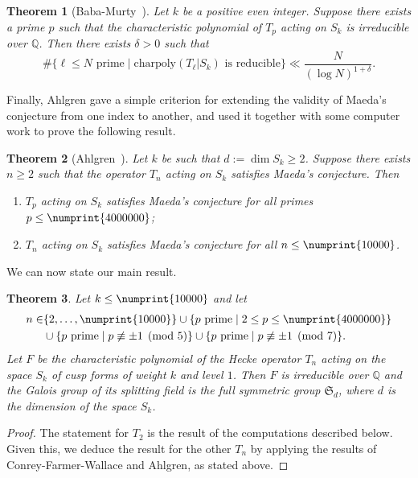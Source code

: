 \documentclass[11pt]{article}
\theoremstyle{plain}
\newtheorem{theorem}{Theorem}[section]
\theoremstyle{definition}
\theoremstyle{remark}
\numberwithin{equation}{section}
\newcommand{\QQ}{\mathbb{Q}}
\renewcommand{\SS}{\mathfrak{S}}
\newcommand{\bound}{\numprint{10000}}
\begin{document}
\begin{theorem}[Baba-Murty~\cite{BabaMurty}]
  Let $k$ be a positive even integer.  Suppose there exists a prime $p$ such
  that the characteristic polynomial of $T_p$ acting on $S_k$ is irreducible
  over $\QQ$.  Then there exists $\delta>0$ such that
  \begin{equation*}
    \#\{\ell\leq N\text{ prime}\mid \text{charpoly}(T_\ell|S_k)\text{ is reducible}\}
    \ll \frac{N}{(\log N)^{1+\delta}}.
  \end{equation*}
\end{theorem}

Finally, Ahlgren gave a simple criterion for extending the validity of
Maeda's conjecture from one index to another, and used it together with some
computer work to prove the following result.

\begin{theorem}[Ahlgren~\cite{Ahlgren}]\label{thm:Ahl}
  Let $k$ be such that $d:=\dim S_k\geq 2$.  Suppose there exists $n\geq 2$
  such that the operator $T_n$ acting on $S_k$ satisfies Maeda's conjecture.
  Then
  \begin{enumerate}
    \item $T_p$ acting on $S_k$ satisfies Maeda's conjecture for all primes
      $p\leq\numprint{4000000}$;
    \item $T_n$ acting on $S_k$ satisfies Maeda's conjecture for all
      $n\leq\numprint{10000}$.
  \end{enumerate}
\end{theorem}


We can now state our main result.

\begin{theorem}\label{thm:main}
  Let $k\leq \bound$ and let
  \begin{align*}
    n\in &\{2,\ldots,\numprint{10000}\}\cup
    \{p\text{ prime}\mid 2\leq p\leq\numprint{4000000}\}\\
    &\cup\{p\text{ prime}\mid p\not\equiv\pm 1\pmod{5}\}\cup
    \{p\text{ prime}\mid p\not\equiv\pm 1\pmod{7}\}.
  \end{align*}
  Let $F$ be the characteristic polynomial of the
  Hecke operator $T_n$ acting on the space $S_k$ of cusp forms of weight
  $k$ and level $1$.  Then $F$ is irreducible over $\QQ$ and the Galois
  group of its splitting field is the full symmetric group $\SS_d$, 
  where $d$ is the dimension of the space $S_k$.
\end{theorem}
\begin{proof}
  The statement for $T_2$ is the result of the computations described below.  
  Given this, we deduce the result for the other $T_n$ by applying the results of
  Conrey-Farmer-Wallace and Ahlgren, as stated above.
\end{proof}
\end{document}
